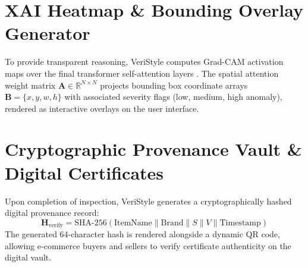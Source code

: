 \section{XAI Heatmap & Bounding Overlay Generator}
To provide transparent reasoning, VeriStyle computes Grad-CAM activation maps over the final transformer self-attention layers \cite{dosovitskiy2020image}. The spatial attention weight matrix $\mathbf{A} \in \mathbb{R}^{N \times N}$ projects bounding box coordinate arrays $\mathbf{B} = \{x, y, w, h\}$ with associated severity flags (low, medium, high anomaly), rendered as interactive overlays on the user interface.

\section{Cryptographic Provenance Vault & Digital Certificates}
Upon completion of inspection, VeriStyle generates a cryptographically hashed digital provenance record:
\begin{equation}
    \mathbf{H}_{\text{verify}} = \text{SHA-256}(\text{ItemName} \parallel \text{Brand} \parallel S \parallel V \parallel \text{Timestamp})
\end{equation}
The generated 64-character hash is rendered alongside a dynamic QR code, allowing e-commerce buyers and sellers to verify certificate authenticity on the digital vault.
